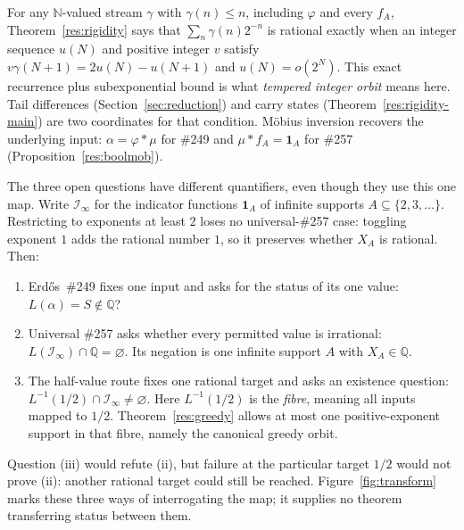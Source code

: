 \documentclass[11pt]{article}
\theoremstyle{definition}
\theoremstyle{remark}
\newcommand{\N}{\mathbb{N}}
\newcommand{\Q}{\mathbb{Q}}
\newcommand{\ph}{\varphi}
\begin{document}
For any \(\N\)-valued stream \(\gamma\) with \(\gamma(n)\le n\), including
\(\ph\) and every \(f_A\), Theorem~\ref{res:rigidity} says that
\(\sum_n\gamma(n)2^{-n}\) is rational exactly when an integer sequence
\(u(N)\) and positive integer $v$ satisfy
\(v\gamma(N+1)=2u(N)-u(N+1)\) and \(u(N)=o(2^N)\).  This exact recurrence
plus subexponential bound is what \emph{tempered integer orbit} means here.
Tail differences (Section~\ref{sec:reduction}) and carry states
(Theorem~\ref{res:rigidity-main}) are two coordinates for that condition.
M\"obius inversion recovers the underlying input: \(\alpha=\ph*\mu\) for
\#249 and \(\mu*f_A=\mathbf 1_A\) for \#257
(Proposition~\ref{res:boolmob}).

The three open questions have different quantifiers, even though they use
this one map.  Write \(\mathcal I_\infty\) for the indicator functions
\(\mathbf 1_A\) of infinite supports \(A\subseteq\{2,3,\ldots\}\).
Restricting to exponents at least \(2\) loses no universal-\#257 case:
toggling exponent \(1\) adds the rational number \(1\), so it preserves
whether \(X_A\) is rational.  Then:
\begin{enumerate}[label=\textup{(\roman*)},leftmargin=2.2em]
\item Erd\H{o}s~\#249 fixes one input and asks for the status of its one
value: \(L(\alpha)=S\notin\Q\)?
\item Universal \#257 asks whether every permitted value is irrational:
\(L(\mathcal I_\infty)\cap\Q=\varnothing\).  Its negation is one infinite
support $A$ with $X_A\in\Q$.
\item The half-value route fixes one rational target and asks an existence
question:
\(L^{-1}(1/2)\cap\mathcal I_\infty\ne\varnothing\).  Here
\(L^{-1}(1/2)\) is the \emph{fibre}, meaning all inputs mapped to $1/2$.
Theorem~\ref{res:greedy} allows at most one positive-exponent support in that
fibre, namely the canonical greedy orbit.
\end{enumerate}
Question (iii) would refute (ii), but failure at the particular target
$1/2$ would not prove (ii): another rational target could still be reached.
Figure~\ref{fig:transform} marks these three ways of interrogating the map;
it supplies no theorem transferring status between them.
\end{document}
